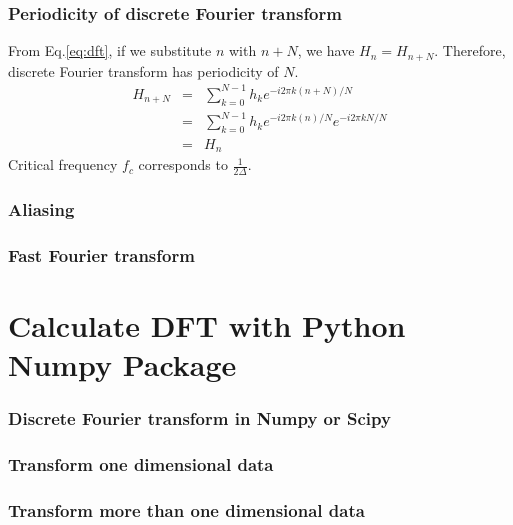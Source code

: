 \documentclass{beamer}
\begin{document}
\begin{frame}
\frametitle{Periodicity of discrete Fourier transform}
From Eq.\ref{eq:dft}, if we substitute $n$ with $n+N$, we have $H_n = H_{n+N}$. Therefore, discrete Fourier transform has periodicity of $N$.
\begin{eqnarray}
H_{n+N} &=& \sum_{k=0}^{N-1}h_ke^{-i2\pi k(n+N)/N} \nonumber \\
&=&\sum_{k=0}^{N-1}h_ke^{-i2\pi k(n)/N}e^{-i2\pi kN/N} \nonumber \\
&=&H_n
\end{eqnarray}
Critical frequency $f_c$ corresponds to $\frac{1}{2\Delta}$.
\end{frame}
\begin{frame}
\frametitle{Aliasing}

\end{frame}
\begin{frame}
\frametitle{Fast Fourier transform}
\end{frame}
\section{Calculate DFT with Python Numpy Package}
\begin{frame}
\frametitle{Discrete Fourier transform in Numpy or Scipy}

\end{frame}
\begin{frame}
\frametitle{Transform one dimensional data}
\end{frame}
\begin{frame}
\frametitle{Transform more than one dimensional data}
\end{frame}
\end{document}
